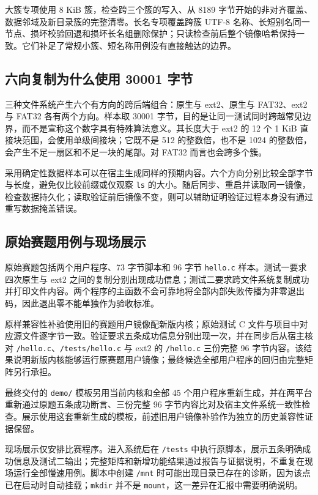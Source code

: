 \documentclass[conference]{IEEEtran}
\newcommand{\code}[1]{\texttt{#1}}
\begin{document}
大簇专项使用 8 KiB 簇，检查跨三个簇的写入、从 8189 字节开始的非对齐覆盖、数据邻域及新目录簇的完整清零。长名专项覆盖跨簇 UTF-8 名称、长短别名同一节点、损坏校验回退和损坏长名组删除保护；只读检查前后整个镜像哈希保持一致。它们补足了常规小簇、短名称用例没有直接触达的边界。

\subsection{六向复制为什么使用 30001 字节}
三种文件系统产生六个有方向的跨后端组合：原生与 ext2、原生与 FAT32、ext2 与 FAT32 各有两个方向。样本取 30001 字节，目的是让同一测试同时跨越常见边界，而不是宣称这个数字具有特殊算法意义。其长度大于 ext2 的 12 个 1 KiB 直接块范围，会使用单级间接块；它既不是 512 的整数倍，也不是 1024 的整数倍，会产生不足一扇区和不足一块的尾部。对 FAT32 而言也会跨多个簇。

采用确定性数据样本可以在宿主生成同样的预期内容。六个方向分别比较全部字节与长度，避免仅比较前缀或仅观察 \code{ls} 的大小。随后同步、重启并读取同一镜像，检查数据持久化；读取验证前后镜像不变，则可以辅助证明验证过程本身没有通过重写数据掩盖错误。

\subsection{原始赛题用例与现场展示}
原始赛题包括两个用户程序、73 字节脚本和 96 字节 \code{hello.c} 样本。测试一要求四次原生与 ext2 之间的复制分别出现成功信息；测试二要求跨文件系统复制成功并打印文件内容。两个程序的主函数不会可靠地将全部内部失败传播为非零退出码，因此退出零不能单独作为验收标准。

原样兼容性补验使用旧的赛题用户镜像配新版内核；原始测试 C 文件与项目中对应源文件逐字节一致。验证要求五条成功信息分别出现一次，并在同步后从宿主核对 \code{/hello.c}、\code{/tests/hello.c} 与 ext2 的 \code{/hello.c} 三份完整 96 字节内容。该结果说明新版内核能够运行原赛题用户镜像；最终候选全部用户程序的回归由完整矩阵另行承担。

最终交付的 \code{demo/} 模板另用当前内核和全部 45 个用户程序重新生成，并在两平台重新通过原题五条成功断言、三份完整 96 字节内容比对及宿主文件系统一致性检查。展示使用这套重新生成的模板，前述旧用户镜像补验作为独立的历史兼容性证据保留。

现场展示仅安排比赛程序。进入系统后在 \code{/tests} 中执行原脚本，展示五条明确成功信息及测试二输出；完整矩阵和新增功能结果通过报告与证据说明，不重复在现场运行全部慢速用例。脚本中创建 \code{/mnt} 时可能出现目录已存在的诊断，因为该点已在启动时自动挂载；\code{mkdir} 并不是 \code{mount}，这一差异在汇报中需要明确说明。
\end{document}
